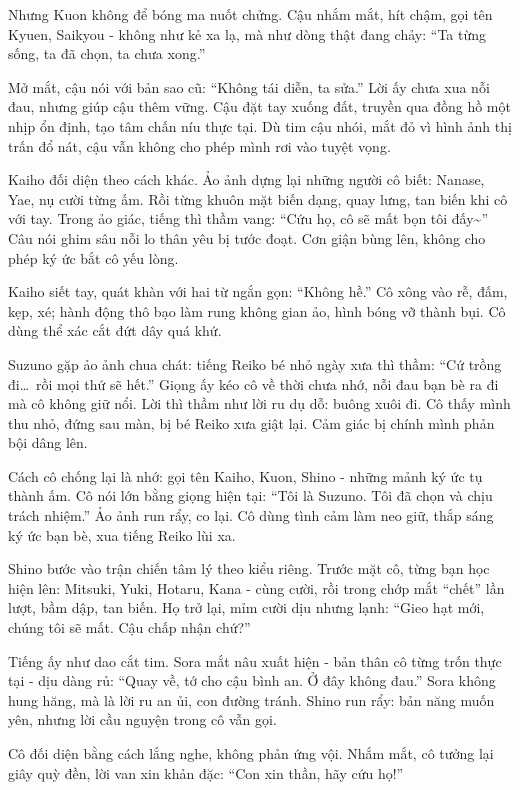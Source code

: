 \documentclass[../main.tex]{subfiles}
\begin{document}
Nhưng Kuon không để bóng ma nuốt chửng. Cậu nhắm mắt, hít chậm, gọi tên Kyuen, Saikyou - không như kẻ xa lạ, mà như dòng thật đang chảy: ``Ta từng sống, ta đã chọn, ta chưa xong.''

Mở mắt, cậu nói với bản sao cũ: ``Không tái diễn, ta sửa.'' Lời ấy chưa xua nỗi đau, nhưng giúp cậu thêm vững. Cậu đặt tay xuống đất, truyền qua đồng hồ một nhịp ổn định, tạo tâm chấn níu thực tại. Dù tim cậu nhói, mắt đỏ vì hình ảnh thị trấn đổ nát, cậu vẫn không cho phép mình rơi vào tuyệt vọng.

Kaiho đối diện theo cách khác. Ảo ảnh dựng lại những người cô biết: Nanase, Yae, nụ cười từng ấm. Rồi từng khuôn mặt biến dạng, quay lưng, tan biến khi cô với tay. Trong ảo giác, tiếng thì thầm vang: ``Cứu họ, cô sẽ mất bọn tôi đấy\~{}'' Câu nói ghim sâu nỗi lo thân yêu bị tước đoạt. Cơn giận bùng lên, không cho phép ký ức bắt cô yếu lòng.

Kaiho siết tay, quát khàn với hai từ ngắn gọn: ``Không hề.'' Cô xông vào rễ, đấm, kẹp, xé; hành động thô bạo làm rung không gian ảo, hình bóng vỡ thành bụi. Cô dùng thể xác cắt đứt dây quá khứ.

Suzuno gặp ảo ảnh chua chát: tiếng Reiko bé nhỏ ngày xưa thì thầm: ``Cứ trồng đi\dots\ rồi mọi thứ sẽ hết.'' Giọng ấy kéo cô về thời chưa nhớ, nỗi đau bạn bè ra đi mà cô không giữ nổi. Lời thì thầm như lời ru dụ dỗ: buông xuôi đi. Cô thấy mình thu nhỏ, đứng sau màn, bị bé Reiko xưa giật lại. Cảm giác bị chính mình phản bội dâng lên.

Cách cô chống lại là nhớ: gọi tên Kaiho, Kuon, Shino - những mảnh ký ức tụ thành ấm. Cô nói lớn bằng giọng hiện tại: ``Tôi là Suzuno. Tôi đã chọn và chịu trách nhiệm.'' Ảo ảnh run rẩy, co lại. Cô dùng tình cảm làm neo giữ, thắp sáng ký ức bạn bè, xua tiếng Reiko lùi xa.

Shino bước vào trận chiến tâm lý theo kiểu riêng. Trước mặt cô, từng bạn học hiện lên: Mitsuki, Yuki, Hotaru, Kana - cùng cười, rồi trong chớp mắt ``chết'' lần lượt, bầm dập, tan biến. Họ trở lại, mỉm cười dịu nhưng lạnh: ``Gieo hạt mới, chúng tôi sẽ mất. Cậu chấp nhận chứ?''

Tiếng ấy như dao cắt tim. Sora mắt nâu xuất hiện - bản thân cô từng trốn thực tại - dịu dàng rủ: ``Quay về, tớ cho cậu bình an. Ở đây không đau.'' Sora không hung hăng, mà là lời ru an ủi, con đường tránh. Shino run rẩy: bản năng muốn yên, nhưng lời cầu nguyện trong cô vẫn gọi.

Cô đối diện bằng cách lắng nghe, không phản ứng vội. Nhắm mắt, cô tưởng lại giây quỳ đền, lời van xin khản đặc: ``Con xin thần, hãy cứu họ!''
\end{document}
